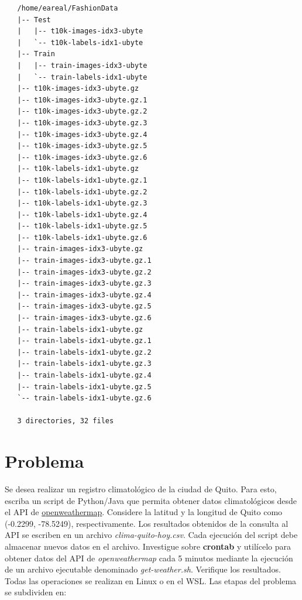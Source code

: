 \documentclass{article}
\begin{document}
\begin{verbatim}
   /home/eareal/FashionData
   |-- Test
   |   |-- t10k-images-idx3-ubyte
   |   `-- t10k-labels-idx1-ubyte
   |-- Train
   |   |-- train-images-idx3-ubyte
   |   `-- train-labels-idx1-ubyte
   |-- t10k-images-idx3-ubyte.gz
   |-- t10k-images-idx3-ubyte.gz.1
   |-- t10k-images-idx3-ubyte.gz.2
   |-- t10k-images-idx3-ubyte.gz.3
   |-- t10k-images-idx3-ubyte.gz.4
   |-- t10k-images-idx3-ubyte.gz.5
   |-- t10k-images-idx3-ubyte.gz.6
   |-- t10k-labels-idx1-ubyte.gz
   |-- t10k-labels-idx1-ubyte.gz.1
   |-- t10k-labels-idx1-ubyte.gz.2
   |-- t10k-labels-idx1-ubyte.gz.3
   |-- t10k-labels-idx1-ubyte.gz.4
   |-- t10k-labels-idx1-ubyte.gz.5
   |-- t10k-labels-idx1-ubyte.gz.6
   |-- train-images-idx3-ubyte.gz
   |-- train-images-idx3-ubyte.gz.1
   |-- train-images-idx3-ubyte.gz.2
   |-- train-images-idx3-ubyte.gz.3
   |-- train-images-idx3-ubyte.gz.4
   |-- train-images-idx3-ubyte.gz.5
   |-- train-images-idx3-ubyte.gz.6
   |-- train-labels-idx1-ubyte.gz
   |-- train-labels-idx1-ubyte.gz.1
   |-- train-labels-idx1-ubyte.gz.2
   |-- train-labels-idx1-ubyte.gz.3
   |-- train-labels-idx1-ubyte.gz.4
   |-- train-labels-idx1-ubyte.gz.5
   `-- train-labels-idx1-ubyte.gz.6

   3 directories, 32 files
\end{verbatim}



\section{Problema}
\label{sec:orge46d9d9}
Se desea realizar un registro climatológico de la ciudad de
Quito. Para esto, escriba un script de Python/Java que permita obtener datos climatológicos desde el API de
\href{https://openweathermap.org/current\#one}{openweathermap}. Considere la latitud y la longitud de Quito como
(-0.2299, -78.5249), respectivamente. Los resultados obtenidos de
la consulta al API se escriben en un archivo
\emph{clima-quito-hoy.csv}. Cada ejecución del script debe almacenar
nuevos datos en el archivo. Investigue sobre \textbf{crontab} y utilícelo
para obtener datos del API de \emph{openweathermap} cada 5 minutos
mediante la ejecución de un archivo ejecutable denominado
\emph{get-weather.sh}. Verifique los resultados. Todas las operaciones
se realizan en Linux o en el WSL. Las etapas del problema se
subdividen en:
\end{document}
